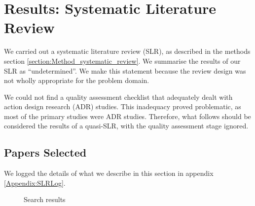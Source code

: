 \section{Results: Systematic Literature Review}
\label{section:Results_SLR}

We carried out a systematic literature review (SLR), as described in the methods section \ref{section:Method_systematic_review}.
We summarise the results of our SLR as ``undetermined''.
We make this statement because the review design was not wholly appropriate for the problem domain.

We could not find a quality assessment checklist that adequately dealt with action design research (ADR) studies.
This inadequacy proved problematic, as most of the primary studies were ADR studies.
Therefore, what follows should be considered the results of a quasi-SLR, with the quality assessment stage ignored.

\subsection{Papers Selected}
We logged the details of what we describe in this section in appendix \ref{Appendix:SLRLog}.

\begin{figure}
    \centering
    \caption{Search results}
    \label{fig:search_results}
\end{figure}

